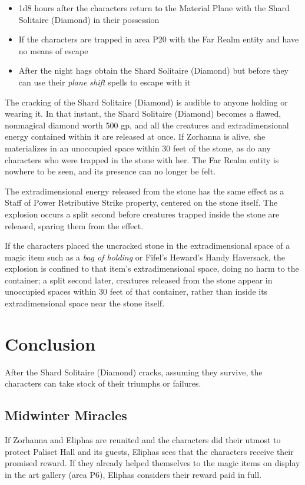 \documentclass[10pt,a4paper,twoside,bg=print,twocolumn,openany,nodeprecatedcode]{dndbook}
\begin{document}
\begin{itemize}
\item 1d8 hours after the characters return to the Material Plane with the Shard Solitaire (Diamond) in their possession
\item If the characters are trapped in area P20 with the Far Realm entity and have no means of escape
\item After the night hags obtain the Shard Solitaire (Diamond) but before they can use their \textit{plane shift} spells to escape with it
\end{itemize}

The cracking of the Shard Solitaire (Diamond) is audible to anyone holding or wearing it. In that instant, the Shard Solitaire (Diamond) becomes a flawed, nonmagical diamond worth 500 gp, and all the creatures and extradimensional energy contained within it are released at once. If Zorhanna is alive, she materializes in an unoccupied space within 30 feet of the stone, as do any characters who were trapped in the stone with her. The Far Realm entity is nowhere to be seen, and its presence can no longer be felt.

The extradimensional energy released from the stone has the same effect as a Staff of Power Retributive Strike property, centered on the stone itself. The explosion occurs a split second before creatures trapped inside the stone are released, sparing them from the effect.

If the characters placed the uncracked stone in the extradimensional space of a magic item such as a \textit{bag of holding} or Fifel's Heward's Handy Haversack, the explosion is confined to that item's extradimensional space, doing no harm to the container; a split second later, creatures released from the stone appear in unoccupied spaces within 30 feet of that container, rather than inside its extradimensional space near the stone itself.

\section{Conclusion}
After the Shard Solitaire (Diamond) cracks, assuming they survive, the characters can take stock of their triumphs or failures.

\subsection{Midwinter Miracles}
If Zorhanna and Eliphas are reunited and the characters did their utmost to protect Paliset Hall and its guests, Eliphas sees that the characters receive their promised reward. If they already helped themselves to the magic items on display in the art gallery (area P6), Eliphas considers their reward paid in full.
\end{document}
